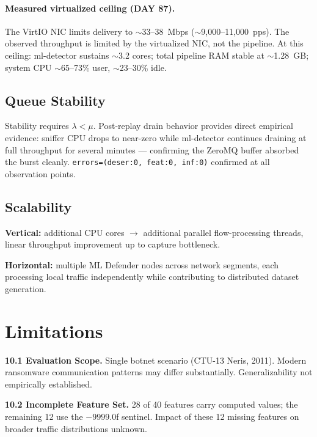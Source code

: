 \documentclass[11pt,a4paper]{article}
\begin{document}
    \paragraph{Measured virtualized ceiling (DAY 87).}
    The VirtIO NIC limits delivery to ${\sim}$33--38~Mbps (${\sim}$9,000--11,000~pps).
    The observed throughput is limited by the virtualized NIC, not the pipeline.
    At this ceiling: ml-detector sustains ${\sim}$3.2 cores; total pipeline RAM stable at
    ${\sim}$1.28~GB; system CPU ${\sim}$65--73\% user, ${\sim}$23--30\% idle.

    \subsection{Queue Stability}

    Stability requires $\lambda < \mu$. Post-replay drain behavior provides direct empirical
    evidence: sniffer CPU drops to near-zero while ml-detector continues draining at full
    throughput for several minutes --- confirming the ZeroMQ buffer absorbed the burst cleanly.
    \texttt{errors=(deser:0, feat:0, inf:0)} confirmed at all observation points.

    \subsection{Scalability}

    \textbf{Vertical:} additional CPU cores $\to$ additional parallel flow-processing threads,
    linear throughput improvement up to capture bottleneck.

    \textbf{Horizontal:} multiple ML Defender nodes across network segments, each processing
    local traffic independently while contributing to distributed dataset generation.

    \section{Limitations}
    \label{sec:limitations}

    \textbf{10.1 Evaluation Scope.} Single botnet scenario (CTU-13 Neris, 2011). Modern
    ransomware communication patterns may differ substantially. Generalizability not empirically
    established.

    \textbf{10.2 Incomplete Feature Set.} 28 of 40 features carry computed values; the
    remaining 12 use the $-9999.0$f sentinel. Impact of these 12 missing features on broader
    traffic distributions unknown.
\end{document}
